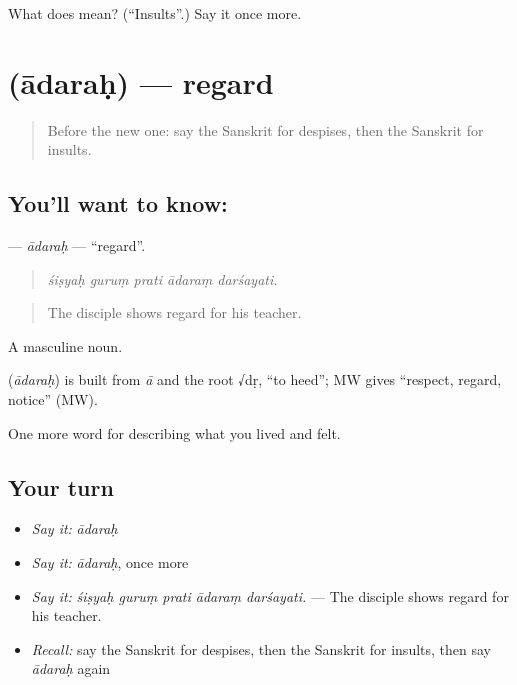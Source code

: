 \begin{tcolorbox}[breakable,colback=teal!4,colframe=teal!35!black,title={Before you move on}]
What does  mean? (\textquotedblleft{}Insults\textquotedblright{}.) Say it once more.
\end{tcolorbox}
\section[\texorpdfstring{\sk{आदरः} (ādaraḥ)}{आदरः (ādaraḥ)}]{ (ādaraḥ) — regard}

\label{lesson:SA-C459-adarah}



\begin{quote}
Before the new one: say the Sanskrit for despises, then the Sanskrit for insults.
\end{quote}

\subsection*{You'll want to know: }
\textbf{} — \emph{ādaraḥ} — \textquotedblleft{}regard\textquotedblright{}.

\begin{quote}
    
\end{quote}

\begin{quote}
\emph{śiṣyaḥ guruṃ prati ādaraṃ darśayati.}
\end{quote}

\begin{quote}
The disciple shows regard for his teacher.
\end{quote}

A masculine noun.

\begin{cousinweb}
\textbf{} (\emph{ādaraḥ}) is built from \emph{ā} and the root √dṛ, \textquotedblleft{}to heed\textquotedblright{}; MW gives \textquotedblleft{}respect, regard, notice\textquotedblright{} (MW).
\end{cousinweb}

\begin{grammarlens}[title={What you've built}]
One more word for describing what you lived and felt.
\end{grammarlens}

\subsection*{Your turn}
\begin{itemize}
\raggedright
  \item \emph{Say it:} \emph{ādaraḥ}
  \item \emph{Say it:} \emph{ādaraḥ}, once more
  \item \emph{Say it:} \emph{śiṣyaḥ guruṃ prati ādaraṃ darśayati.} — The disciple shows regard for his teacher.
  \item \emph{Recall:} say the Sanskrit for despises, then the Sanskrit for insults, then say \emph{ādaraḥ} again
\end{itemize}

